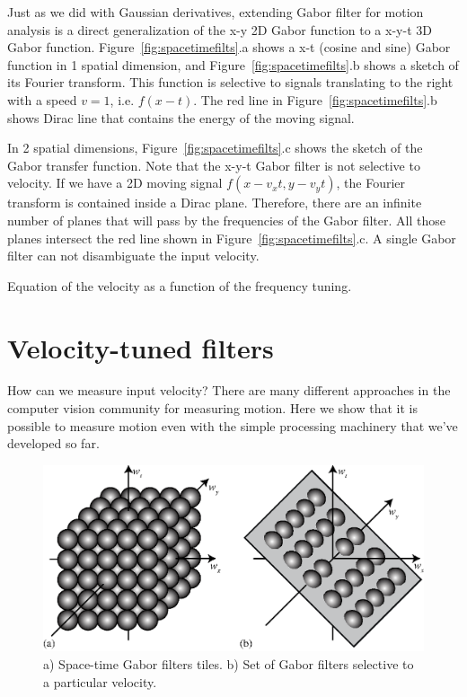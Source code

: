 Just as we did with Gaussian derivatives, extending Gabor filter for motion analysis is a direct generalization of the x-y 2D Gabor function to a x-y-t 3D Gabor function. Figure~\ref{fig:spacetimefilts}.a shows a x-t (cosine and sine) Gabor function in 1 spatial dimension, and  Figure~\ref{fig:spacetimefilts}.b shows a sketch of its Fourier transform. This function is selective to signals translating to the right with a speed $v=1$, i.e. $f(x-t)$. The red line in Figure~\ref{fig:spacetimefilts}.b shows Dirac line that contains the energy of the moving signal.

In 2 spatial dimensions, Figure~\ref{fig:spacetimefilts}.c shows the sketch of the Gabor transfer function. Note that the x-y-t Gabor filter is not selective to velocity. If we have a 2D moving signal $f(x-v_xt, y-v_yt)$, the Fourier transform is contained inside a Dirac plane. Therefore, there are an infinite number of planes that will pass by the frequencies of the Gabor filter. All those planes intersect the red line shown in Figure~\ref{fig:spacetimefilts}.c. A single Gabor filter can not disambiguate the input velocity.

Equation of the velocity as a function of the frequency tuning.


\section{Velocity-tuned filters}
\label{sect:velocityTunedFilters}

How can we measure input velocity? There are many different approaches in the computer vision community
for measuring motion.  Here we show that it is possible
to measure motion even with the simple processing machinery that
we've developed so far.

\begin{figure}
    \centerline{
        \includegraphics[width=1\linewidth]{figures/temporal_filters/gabor_spacetime_tiles.eps}
    }
    \caption{a) Space-time Gabor filters tiles. b) Set of Gabor filters selective to a particular velocity.}
    \label{fig:spacetimetiles}
\end{figure}



